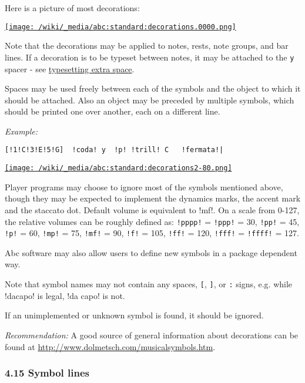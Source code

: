 Here is a picture of most decorations:

\href{/wiki/_detail/abc:standard:decorations.0000.png?id=abc\%3Astandard\%3Av2.1}{\texttt{[image: /wiki/\_media/abc:standard:decorations.0000.png]}}

Note that the decorations may be applied to notes, rests, note groups,
and bar lines. If a decoration is to be typeset between notes, it may be
attached to the \texttt{y} spacer - see
\protect\hyperlink{typesetting_extra_space}{typesetting extra space}.

Spaces may be used freely between each of the symbols and the object to
which it should be attached. Also an object may be preceded by multiple
symbols, which should be printed one over another, each on a different
line.

\emph{Example:}

\begin{verbatim}
[!1!C!3!E!5!G]  !coda! y  !p! !trill! C   !fermata!|
\end{verbatim}

\href{/wiki/_detail/abc:standard:decorations2-80.png?id=abc\%3Astandard\%3Av2.1}{\texttt{[image: /wiki/\_media/abc:standard:decorations2-80.png]}}

Player programs may choose to ignore most of the symbols mentioned
above, though they may be expected to implement the dynamics marks, the
accent mark and the staccato dot. Default volume is equivalent to !mf!.
On a scale from 0-127, the relative volumes can be roughly defined as:
\texttt{!pppp!} = \texttt{!ppp!} = 30, \texttt{!pp!} = 45, \texttt{!p!}
= 60, \texttt{!mp!} = 75, \texttt{!mf!} = 90, \texttt{!f!} = 105,
\texttt{!ff!} = 120, \texttt{!fff!} = \texttt{!ffff!} = 127.

Abc software may also allow users to define new symbols in a package
dependent way.

Note that symbol names may not contain any spaces, \texttt{{[}},
\texttt{{]}}, \texttt{\textbar{}} or \texttt{:} signs, e.g. while
!dacapo! is legal, !da capo! is not.

If an unimplemented or unknown symbol is found, it should be ignored.

\emph{Recommendation:} A good source of general information about
decorations can be found at
\url{http://www.dolmetsch.com/musicalsymbols.htm}.

\hypertarget{symbol_lines}{\subsubsection{4.15 Symbol
lines}\label{symbol_lines}}

